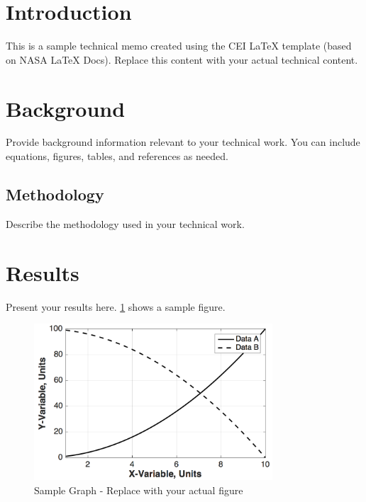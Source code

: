 \documentclass[template=tech-memo]{nasa-latex-docs}
\begin{document}

\section{Introduction}

This is a sample technical memo created using the CEI LaTeX template (based on NASA LaTeX Docs\cite{nasa-latex-docs}). Replace this content with your actual technical content.

\section{Background}

Provide background information relevant to your technical work. You can include equations, figures, tables, and references as needed.

\subsection{Methodology}

Describe the methodology used in your technical work.

\section{Results}

Present your results here. \ref{fig:sample_graph} shows a sample figure.

\begin{figure}[H]
   \centering
   \includegraphics[width=3.5in]{fig/sample_graph}
   \caption{Sample Graph - Replace with your actual figure}
   \label{fig:sample_graph}
\end{figure}
\end{document}
